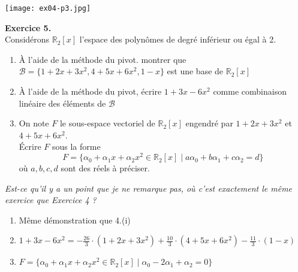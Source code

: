 \documentclass[a4paper, 10pt]{report}
\begin{document}
	\texttt{[image: ex04-p3.jpg]}
	
	\newpage
	
	\noindent
	\textbf{Exercice 5.}\\
	Considérons $\mathbb{R}_2[x]$ l'espace des polynômes de degré
	inférieur ou égal à 2.
	\begin{enumerate}[label=(\roman*)]
		\item À l'aide de la méthode du pivot. montrer que
		$\mathcal{B} = \{1 + 2x + 3x^2, 4 + 5x + 6x^2, 1 -x\}$
		est une base de $\mathbb{R}_2[x]$
		\item À l'aide de la méthode du pivot, écrire $1 + 3x -6x^2$
		comme combinaison linéaire des éléments de $\mathcal{B}$
		\item On note $F$ le sous-espace vectoriel de $\mathbb{R}_2[x]$
		engendré par $1 + 2x + 3x^2$ et $4 + 5x + 6x^2$.\\
		Écrire $F$ sous la forme
		\[
		F = \{\alpha_0 + \alpha_1x + \alpha_2x^2 \in \mathbb{R}_2[x]
			\mid a\alpha_0 + b\alpha_1 + c\alpha_2 = d\}
		\]
		où $a, b, c, d$ sont des réels à préciser.
	\end{enumerate}
	
	\colorbox{solution}
	{\begin{minipage}{0.9\textwidth}
		\textit{\color{blue} Est-ce qu'il y a un point que je ne
		remarque pas, où c'est exactement le même exercice que
		Exercice 4 ?}\\
		
		\begin{enumerate}[label=(\roman*)]
			\item Même démonstration que 4.(i)
			\item $1 + 3x -6x^2 = -\frac{26}{3} \cdot (1 + 2x + 3x^2) +
				\frac{10}{3} \cdot (4 + 5x + 6x^2) -
				\frac{11}{3} \cdot (1 - x)$
			\item $F = \{\alpha_0 + \alpha_1x + \alpha_2x^2 \in \mathbb{R}_2[x]
			\mid \alpha_0 - 2\alpha_1 + \alpha_2 = 0\}$
		\end{enumerate}
	\end{minipage}}
	
%	
%	
	
\end{document}
